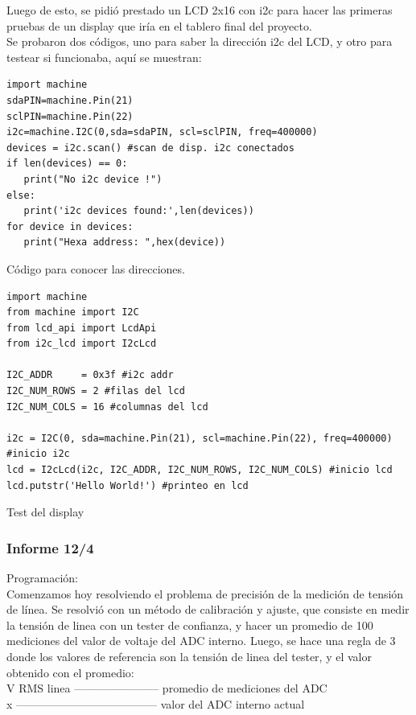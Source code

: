 Luego de esto, se pidió prestado un LCD 2x16 con i2c para hacer las primeras pruebas de un display que iría en el tablero final del proyecto.\\

Se probaron dos códigos, uno para saber la dirección i2c del LCD, y otro para testear si funcionaba, aquí se muestran:\\

\begin{listing}[H]
\begin{verbatim}
import machine
sdaPIN=machine.Pin(21)
sclPIN=machine.Pin(22)
i2c=machine.I2C(0,sda=sdaPIN, scl=sclPIN, freq=400000)
devices = i2c.scan() #scan de disp. i2c conectados
if len(devices) == 0:
   print("No i2c device !")
else:
   print('i2c devices found:',len(devices))
for device in devices:
   print("Hexa address: ",hex(device))
\end{verbatim}
\caption{Código para conocer las direcciones.}
\label{conocer direcciones}
\end{listing}

\begin{listing}[H]
\begin{verbatim}
import machine
from machine import I2C
from lcd_api import LcdApi
from i2c_lcd import I2cLcd

I2C_ADDR     = 0x3f #i2c addr
I2C_NUM_ROWS = 2 #filas del lcd
I2C_NUM_COLS = 16 #columnas del lcd

i2c = I2C(0, sda=machine.Pin(21), scl=machine.Pin(22), freq=400000) #inicio i2c
lcd = I2cLcd(i2c, I2C_ADDR, I2C_NUM_ROWS, I2C_NUM_COLS) #inicio lcd
lcd.putstr('Hello World!') #printeo en lcd
\end{verbatim}
\caption{Test del display}
\label{test display}
\end{listing}

\subsubsection{Informe 12/4}

Programación:\\
Comenzamos hoy resolviendo el problema de precisión de la medición de tensión de línea. Se resolvió con un método de calibración y ajuste, que consiste en medir la tensión de linea con un tester de confianza, y hacer un promedio de 100 mediciones del valor de voltaje del ADC interno. Luego, se hace una regla de 3 donde los valores de referencia son la tensión de linea del tester, y el valor obtenido con el promedio:\\
V RMS linea —-------------------- promedio de mediciones del ADC\\
x —----------------------------------- valor del ADC interno actual\\

